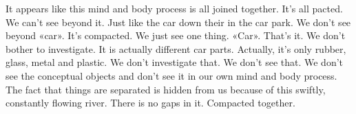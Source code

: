 \documentclass[letterpaper,10pt,english]{sphinxmanual}
\begin{document}
\sphinxAtStartPar
{}
It appears like this mind and body process
is all joined together. It’s all pacted. We can’t see beyond it. Just like the car
down their in the car park. We don’t see beyond «car». It’s compacted. We
just see one thing. «Car». That’s it. We don’t bother to investigate. It is actually different car parts. Actually, it’s only rubber, glass, metal and plastic. We
don’t investigate that. We don’t see that. We don’t see the conceptual objects
and don’t see it in our own mind and body process. The fact that things are
separated is hidden from us because of this swiftly, constantly flowing river.
There is no gaps in it. Compacted together.
\end{document}
